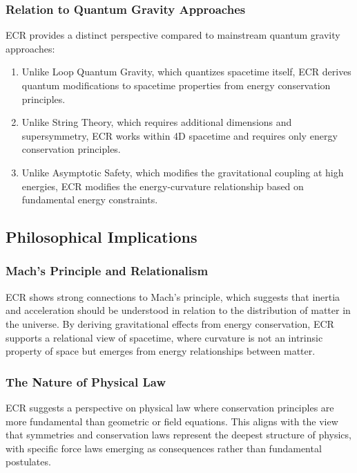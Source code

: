\documentclass[11pt,a4paper]{article}
\begin{document}
\subsubsection{Relation to Quantum Gravity Approaches}

ECR provides a distinct perspective compared to mainstream quantum gravity approaches:

\begin{enumerate}
    \item Unlike Loop Quantum Gravity, which quantizes spacetime itself, ECR derives quantum modifications to spacetime properties from energy conservation principles.
    
    \item Unlike String Theory, which requires additional dimensions and supersymmetry, ECR works within 4D spacetime and requires only energy conservation principles.
    
    \item Unlike Asymptotic Safety, which modifies the gravitational coupling at high energies, ECR modifies the energy-curvature relationship based on fundamental energy constraints.
\end{enumerate}

\subsection{Philosophical Implications}

\subsubsection{Mach's Principle and Relationalism}

ECR shows strong connections to Mach's principle, which suggests that inertia and acceleration should be understood in relation to the distribution of matter in the universe. By deriving gravitational effects from energy conservation, ECR supports a relational view of spacetime, where curvature is not an intrinsic property of space but emerges from energy relationships between matter.

\subsubsection{The Nature of Physical Law}

ECR suggests a perspective on physical law where conservation principles are more fundamental than geometric or field equations. This aligns with the view that symmetries and conservation laws represent the deepest structure of physics, with specific force laws emerging as consequences rather than fundamental postulates.
\end{document}
